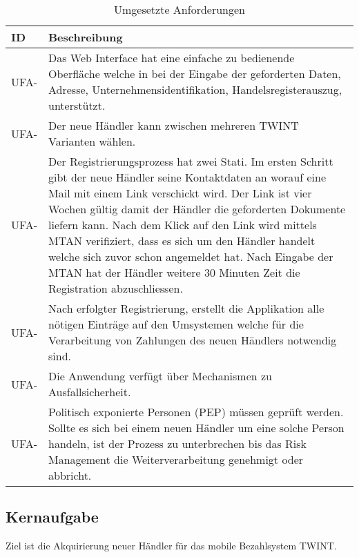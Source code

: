 \begin{table}[H]
	\centering
	\caption{Umgesetzte Anforderungen}
	\begin{tabular}{ | p{2cm} | p{13cm} | }
		\toprule
		\textbf{ID} & \textbf{Beschreibung} \\
		\midrule
		UFA-\arabic{impFuncReq} \stepcounter{impFuncReq} & Das Web Interface hat eine einfache zu bedienende Oberfläche welche in bei der Eingabe der geforderten Daten, Adresse, Unternehmensidentifikation, Handelsregisterauszug, unterstützt. \\ \hline
		UFA-\arabic{impFuncReq} \stepcounter{impFuncReq} & Der neue Händler kann zwischen mehreren TWINT Varianten wählen.\\ \hline
		UFA-\arabic{impFuncReq} \stepcounter{impFuncReq} & Der Registrierungsprozess hat zwei Stati. Im ersten Schritt gibt der neue Händler seine Kontaktdaten an worauf eine Mail mit einem Link verschickt wird. Der Link ist vier Wochen gültig damit der Händler die geforderten Dokumente liefern kann. Nach dem Klick auf den Link wird mittels MTAN verifiziert, dass es sich um den Händler handelt welche sich zuvor schon angemeldet hat. Nach Eingabe der MTAN hat der Händler weitere 30 Minuten Zeit die Registration abzuschliessen.\\ \hline
		UFA-\arabic{impFuncReq} \stepcounter{impFuncReq} & Nach erfolgter Registrierung, erstellt die Applikation alle nötigen Einträge auf den Umsystemen welche für die Verarbeitung von Zahlungen des neuen Händlers notwendig sind.\\ \hline
		UFA-\arabic{impFuncReq} \stepcounter{impFuncReq} & Die Anwendung verfügt über Mechanismen zu Ausfallsicherheit.\\ \hline
		UFA-\arabic{impFuncReq} \stepcounter{impFuncReq} & Politisch exponierte Personen (PEP) müssen geprüft werden. Sollte es sich bei einem neuen Händler um eine solche Person handeln, ist der Prozess zu unterbrechen bis das Risk Management die Weiterverarbeitung genehmigt oder abbricht.\\ 
		\bottomrule
	\end{tabular}
\end{table}

\subsection{Kernaufgabe}

Ziel ist die Akquirierung neuer Händler für das mobile Bezahlsystem TWINT.


